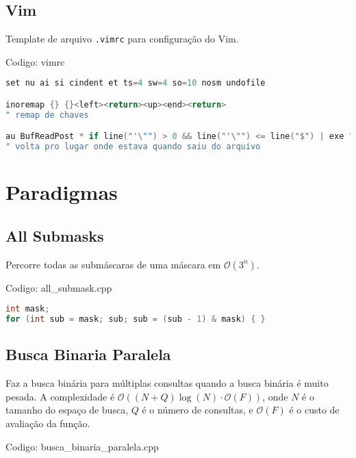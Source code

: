 \documentclass[10pt, a4paper, oneside]{book}
\begin{document}
\section{Vim}


Template de arquivo \texttt{.vimrc} para configuração do Vim.

\hfill

Codigo: vimrc

\begin{lstlisting}[language=C++]
set nu ai si cindent et ts=4 sw=4 so=10 nosm undofile

inoremap {} {}<left><return><up><end><return>
" remap de chaves

au BufReadPost * if line("'\"") > 0 && line("'\"") <= line("$") | exe "normal! g'\"" | endif
" volta pro lugar onde estava quando saiu do arquivo
\end{lstlisting}
\hfill

\newpage

%
%
%
%

\chapter{Paradigmas}

\section{All Submasks}


Percorre todas as submáscaras de uma máscara em $\mathcal{O}(3^n)$.

\hfill

Codigo: all\_submask.cpp

\begin{lstlisting}[language=C++]
int mask;
for (int sub = mask; sub; sub = (sub - 1) & mask) { }
\end{lstlisting}
\hfill

\section{Busca Binaria Paralela}


Faz a busca binária para múltiplas consultas quando a busca binária é muito pesada. A complexidade é $\mathcal{O}((N+Q) \log(N) \cdot \mathcal{O}(F))$, onde $N$ é o tamanho do espaço de busca, $Q$ é o número de consultas, e $\mathcal{O}(F)$ é o custo de avaliação da função.

\hfill

Codigo: busca\_binaria\_paralela.cpp
\end{document}
